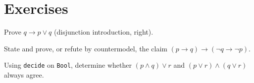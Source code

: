 \section{Exercises}

\begin{exercise}
Prove $q \to p \lor q$ (disjunction introduction, right).
\end{exercise}

\begin{exercise}
State and prove, or refute by countermodel, the claim
$(p \to q) \to (\lnot q \to \lnot p)$.
\end{exercise}

\begin{exercise}
Using \texttt{decide} on \texttt{Bool}, determine whether
$(p \land q) \lor r$ and $(p \lor r) \land (q \lor r)$ always agree.
\end{exercise}
